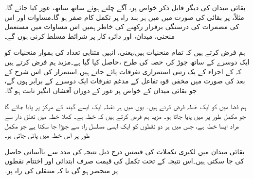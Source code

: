 بقائی میدان کی دیگر قابل ذکر خواص پر، آگے چلتے ہوئے ساتھ ساتھ، غور کیا جائے گا۔ مثلاً،  پر بقائی  کی صورت میں  میں ہر بند راہ پر تکمل کام صفر ہو گا۔مساوات  اور اس کی مضمرات کی درستگی برقرار رکھنے  کی خاطر ہمیں اس مساوات میں مستعمل منحنی، میدان، اور دائرہ کار پر شرائط مسلط کرنی ہوں گے۔

ہم فرض کرتے ہیں کہ تمام منحنیات  ہیں،یعنی، انہیں متناہی تعداد کی ہموار  منحنیات کو ایک دوسرے کے ساتھ جوڑ کر، حصہ  کی طرح ،حاصل کیا گیا ہے۔مزید ہم فرض کرتے ہیں کہ  کے اجزاء کے یک رتبی استمراری تفرقات  پائے جاتے ہیں۔استمرار کی اس شرح  کے بعد  کی صورت میں مخفی قوہ تفاعل  کے مدغم تفرقات ایک دوسرے کے برابر ہوں گے، جو بقائی میدان  کے خواص پر غور کے دوران آفشاں انگیز ثابت ہو گا۔

ہم فضا میں  کو ایک  خطہ فرض کرتے ہیں۔ یوں  میں ہر نقطہ ایک ایسے گیند کے مرکز پر پایا جائے گا جو مکمل طور پر  میں پایا جاتا ہو۔ مزید ہم فرض کرتے ہیں کہ   خطہ ہے۔  کھلا خطہ میں تعلق دار سے مراد  ایسا خطہ ہے، جس میں ہر دو نقطوں کو ایک ایسی مسلسل راہ سے جوڑا جا سکتا ہے جو مکمل طور پر اس خطہ میں پائی جاتی ہو۔ 

بقائی میدان میں لکیری تکملات کی قیمتیں درج ذیل نتیجہ کی مدد سے باآسانی حاصل کی جا سکتی ہیں۔اس نتیجہ کے تحت تکمل کی قیمت صرف ابتدائی اور اختتام نقطوں پر منحصر ہو گی نا کہ منتقلی کی راہ پر۔

